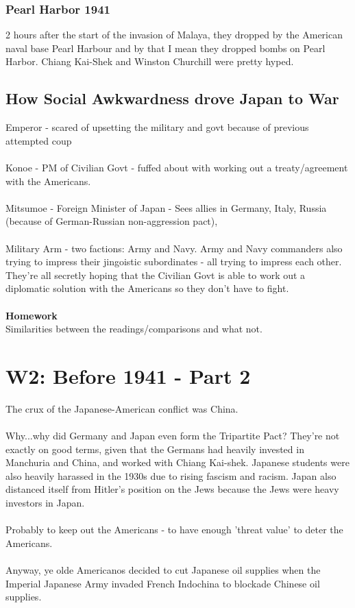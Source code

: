 \documentclass[a4paper]{article}
\begin{document}
\subsubsection{Pearl Harbor 1941}
2 hours after the start of the invasion of Malaya, they dropped by the American naval base Pearl Harbour and by that I mean they dropped bombs on Pearl Harbor. Chiang Kai-Shek and Winston Churchill were pretty hyped.
\subsection{How Social Awkwardness drove Japan to War}
Emperor - scared of upsetting the military and govt because of previous attempted coup\\
\\
Konoe - PM of Civilian Govt - fuffed about with working out a treaty/agreement with the Americans.\\
\\
Mitsumoe - Foreign Minister of Japan - Sees allies in Germany, Italy, Russia (because of German-Russian non-aggression pact),\\
\\
Military Arm - two factions: Army and Navy. Army and Navy commanders also trying to impress their jingoistic subordinates - all trying to impress each other. They're all secretly hoping that the Civilian Govt is able to work out a diplomatic solution with the Americans so they don't have to fight.\\
\\
\textbf{Homework}\\
Similarities between the readings/comparisons and what not.
\section{W2: Before 1941 - Part 2}
The crux of the Japanese-American conflict was China.\\
\\
Why...why did Germany and Japan even form the Tripartite Pact? They're not exactly on good terms, given that the Germans had heavily invested in Manchuria and China, and worked with Chiang Kai-shek. Japanese students were also heavily harassed in the 1930s due to rising fascism and racism. Japan also distanced itself from Hitler's position on the Jews because the Jews were heavy investors in Japan.\\
\\
Probably to keep out the Americans - to have enough 'threat value' to deter the Americans.\\
\\
Anyway, ye olde Americanos decided to cut Japanese oil supplies when the Imperial Japanese Army invaded French Indochina to blockade Chinese oil supplies.
\end{document}
